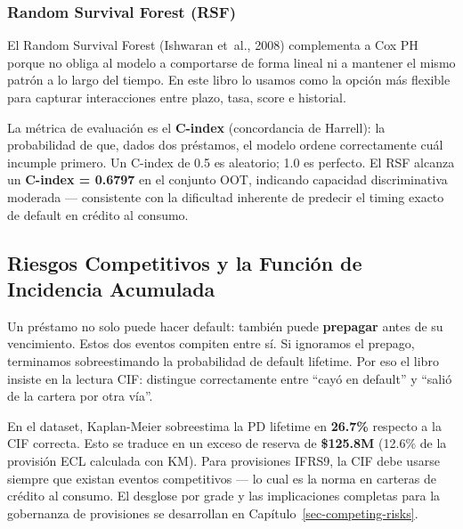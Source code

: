 \documentclass[
  spanish,
  11pt,
  letterpaper,
]{scrbook}
\theoremstyle{plain}
\theoremstyle{remark}
\begin{document}
\subsubsection{Random Survival Forest
(RSF)}\label{random-survival-forest-rsf}

El Random Survival Forest (Ishwaran et~al., 2008) complementa a Cox PH
porque no obliga al modelo a comportarse de forma lineal ni a mantener
el mismo patrón a lo largo del tiempo. En este libro lo usamos como la
opción más flexible para capturar interacciones entre plazo, tasa, score
e historial.

La métrica de evaluación es el \textbf{C-index} (concordancia de
Harrell): la probabilidad de que, dados dos préstamos, el modelo ordene
correctamente cuál incumple primero. Un C-index de 0.5 es aleatorio; 1.0
es perfecto. El RSF alcanza un \textbf{C-index = 0.6797} en el conjunto
OOT, indicando capacidad discriminativa moderada --- consistente con la
dificultad inherente de predecir el timing exacto de default en crédito
al consumo.

\subsection{Riesgos Competitivos y la Función de Incidencia
Acumulada}\label{riesgos-competitivos-y-la-funciuxf3n-de-incidencia-acumulada}

Un préstamo no solo puede hacer default: también puede \textbf{prepagar}
antes de su vencimiento. Estos dos eventos compiten entre sí. Si
ignoramos el prepago, terminamos sobreestimando la probabilidad de
default lifetime. Por eso el libro insiste en la lectura CIF: distingue
correctamente entre ``cayó en default'' y ``salió de la cartera por otra
vía''.

\begin{tcolorbox}[enhanced jigsaw, arc=.35mm, bottomrule=.15mm, bottomtitle=1mm, breakable, colback=white, colbacktitle=quarto-callout-warning-color!10!white, colframe=quarto-callout-warning-color-frame, coltitle=black, left=2mm, leftrule=.75mm, opacityback=0, opacitybacktitle=0.6, rightrule=.15mm, title=\textcolor{quarto-callout-warning-color}{\faExclamationTriangle}\hspace{0.5em}{KM vs CIF: Sobreestimación del 26.7\%}, titlerule=0mm, toprule=.15mm, toptitle=1mm]

En el dataset, Kaplan-Meier sobreestima la PD lifetime en
\textbf{26.7\%} respecto a la CIF correcta. Esto se traduce en un exceso
de reserva de \textbf{\$125.8M} (12.6\% de la provisión ECL calculada
con KM). Para provisiones IFRS9, la CIF debe usarse siempre que existan
eventos competitivos --- lo cual es la norma en carteras de crédito al
consumo. El desglose por grade y las implicaciones completas para la
gobernanza de provisiones se desarrollan en
Capítulo~\ref{sec-competing-risks}.

\end{tcolorbox}
\end{document}
